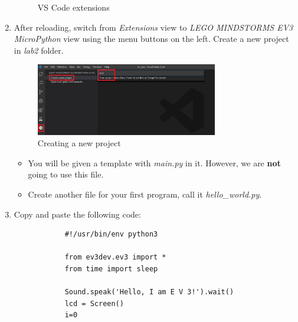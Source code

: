 \documentclass{scrartcl}
\begin{document}
\begin{enumerate}
\begin{figure}[h!]
\begin{center}
              \caption{VS Code extensions}
            \end{center}
        \end{figure}
    \item After reloading, switch from \textit{Extensions} view to \textit{LEGO MINDSTORMS EV3 MicroPython} view using the menu buttons on the left. Create a new project in \textit{lab2} folder.
        \begin{figure}[h!]
            \begin{center}
              \includegraphics[width=0.75\textwidth]{new.jpg}
              \caption{Creating a new project}
            \end{center}
        \end{figure}
    \begin{itemize}
        \item You will be given a template with \textit{main.py} in it. However, we are \textbf{not} going to use this file. 
        \item Create another file for your first program, call it \textit{hello\_world.py}.
    \end{itemize}

    \item Copy and paste the following code:
        \begin{lstlisting}
            #!/usr/bin/env python3

            from ev3dev.ev3 import *
            from time import sleep
            
            Sound.speak('Hello, I am E V 3!').wait()
            lcd = Screen()
            i=0
            

\end{lstlisting}
\end{enumerate}
\end{document}
